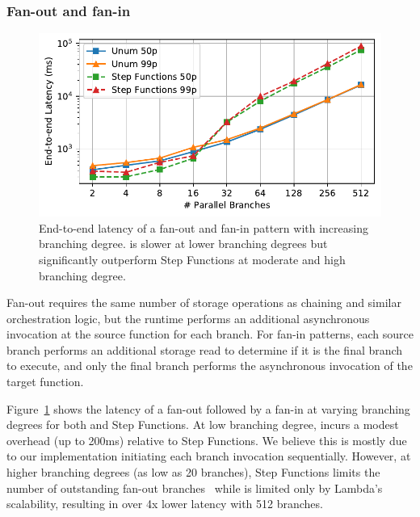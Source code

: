 \subsubsection{Fan-out and fan-in}\label{sec:eval:fan-out}

\begin{figure}[t]
  \centering
  \includegraphics[width=\columnwidth]{figures/MapMicroLatency.pdf}
  \caption{End-to-end latency of a fan-out and fan-in pattern with increasing
branching degree. \name{} is slower at lower branching degrees but significantly
outperform Step Functions at moderate and high branching degree.}
  \label{fig:mapmicrolatency}
\end{figure}

Fan-out requires the same number of storage operations as chaining and similar
orchestration logic, but the \name{} runtime performs an additional asynchronous
invocation at the source function for each branch. For fan-in patterns, each
source branch performs an additional storage read to determine if it is the
final branch to execute, and only the final branch performs the asynchronous
invocation of the target function.


Figure~\ref{fig:mapmicrolatency} shows the latency of a fan-out followed by a
fan-in at varying branching degrees for both \name{} and Step Functions. At
low branching degree, \name{} incurs a modest overhead (up to 200ms) relative
to Step Functions. We believe this is mostly due to our implementation
initiating each branch invocation sequentially. However, at higher branching
degrees (as low as 20 branches), Step Functions limits the number of
outstanding fan-out branches~\cite{aws-step-functions-map-state} while
\name{} is limited only by Lambda's scalability, resulting in over 4x lower
latency with 512 branches.


